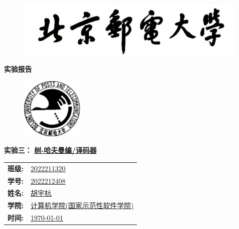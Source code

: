 \documentclass[UTF8, 12pt, a4paper, oneside]{ctexart}
\begin{document}
	\sloppy
	\thispagestyle{empty}
    \begin{figure}[t]
		\centering
		\includegraphics[width=13cm]{logo1.jpg}
	\end{figure}

    \begin{center}
        \Huge\textbf{实验报告}
    \end{center}
	\vspace*{1em}
    \begin{figure}[htbp]
		\centering
		\includegraphics[width=3cm]{logo2.jpg}
	\end{figure}
		\begin{center}
			\Huge\textbf{实验三：} \underline{\textbf{树-哈夫曼编/译码器}} 
		\end{center}
    \vspace*{5em}
	\begin{table}[htbp]
		\centering
		\large
		\begin{tabular}{ll}
        \textbf{班级:} & \underline{2022211320} \\
		\textbf{学号:} & \underline{2022212408} \\
		\textbf{姓名:} & \underline{胡宇杭} \\
		\textbf{学院:} & \underline{计算机学院(国家示范性软件学院)} \\
        \textbf{时间:} & \underline{\today} \\
		\end{tabular}
	\end{table}
	\newpage
	\tableofcontents
    \newpage
    
    
    
    
    
    
\end{document}
